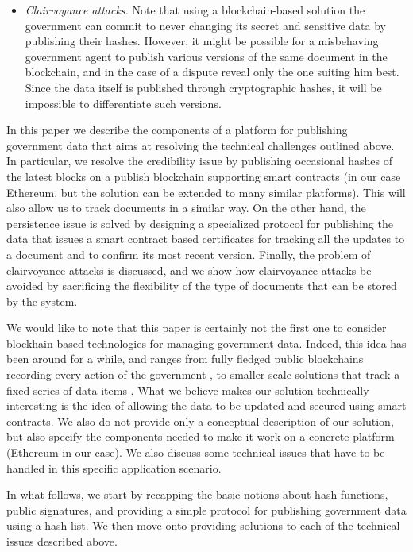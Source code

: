 \begin{itemize}
\item {\it Clairvoyance attacks.} Note that using a blockchain-based solution the government can commit to never changing its secret and sensitive data by publishing their hashes. However, it might be possible for a misbehaving government agent to publish various versions of the same document in the blockchain, and in the case of a dispute reveal only the one suiting him best. Since the data itself is published through cryptographic hashes, it will be impossible to differentiate such versions.
\end{itemize}

In this paper we describe the components of a platform for publishing government data that aims at resolving the technical challenges outlined above. In particular, 
we resolve the credibility issue by publishing occasional hashes of the latest blocks on a publish blockchain supporting smart contracts (in our case Ethereum, but the solution can be extended to many similar platforms). This will also allow us to track documents in a similar way. On the other hand, the persistence issue is solved by designing a specialized protocol for publishing the data that issues a smart contract based certificates for tracking all the updates to a document and to confirm its most recent version. Finally, the problem of clairvoyance attacks is discussed, and we show how clairvoyance attacks be avoided by sacrificing the flexibility of the type of documents that can be stored by the system.


We would like to note that this paper is certainly not the first one to consider blockhain-based technologies for managing government data. Indeed, this idea has been around for a while, and ranges from fully fledged public blockchains recording every action of the government \cite{eushit,ibmshit}, to smaller scale solutions that track a fixed series of data items \cite{energiaabierta}. What we believe makes our solution technically interesting is the idea of allowing the data to be updated and secured using smart contracts. We also do not provide only a conceptual description of our solution, but also specify the components needed to make it work on a concrete platform (Ethereum in our case). We also discuss some technical issues that have to be handled in this specific application scenario.

In what follows, we start by recapping the basic notions about hash functions, public signatures, and providing a simple protocol for publishing government data using a hash-list. We then move onto providing solutions to each of the technical issues described above.
